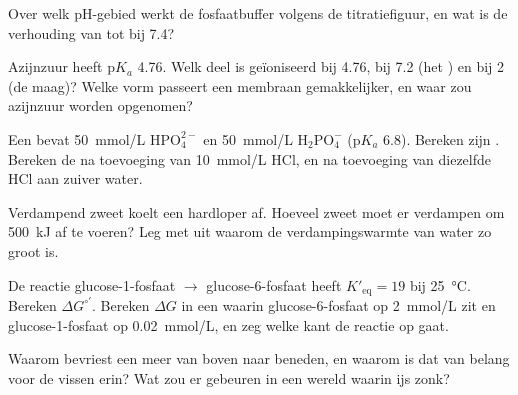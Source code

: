 \begin{exercise}[$\star$]\label{exo:b1:water-small-molecules:4}
Over welk pH-gebied werkt de fosfaatbuffer volgens de titratiefiguur, en wat is
de verhouding van  tot  bij  7.4?
\end{exercise}

\begin{exercise}[$\star\star$]\label{exo:b1:water-small-molecules:5}
Azijnzuur heeft p$K_a$ 4.76. Welk deel is geïoniseerd bij  4.76, bij  7.2
(het ) en bij  2 (de maag)? Welke vorm passeert een membraan
gemakkelijker, en waar zou azijnzuur worden opgenomen?
\end{exercise}

\begin{exercise}[$\star\star$]\label{exo:b1:water-small-molecules:6}
Een  bevat \qty{50}{mmol/L} $\mathrm{HPO_4^{2-}}$ en \qty{50}{mmol/L}
$\mathrm{H_2PO_4^-}$ (p$K_a$ 6.8). Bereken zijn . Bereken de  na toevoeging
van \qty{10}{mmol/L} HCl, en na toevoeging van diezelfde HCl aan zuiver water.
\end{exercise}

\begin{exercise}[$\star\star$]\label{exo:b1:water-small-molecules:7}
Verdampend zweet koelt een hardloper af. Hoeveel zweet moet er verdampen om
\qty{500}{kJ} af te voeren? Leg met  uit waarom de
verdampingswarmte van water zo groot is.
\end{exercise}

\begin{exercise}[$\star\star$]\label{exo:b1:water-small-molecules:8}
De reactie glucose-1-fosfaat $\to$ glucose-6-fosfaat heeft
$K'_{\text{eq}} = 19$ bij \qty{25}{\celsius}. Bereken
$\Delta G^{\circ\prime}$. Bereken $\Delta G$ in een  waarin
glucose-6-fosfaat op \qty{2}{mmol/L} zit en glucose-1-fosfaat op
\qty{0.02}{mmol/L}, en zeg welke kant de reactie op gaat.
\end{exercise}

\begin{exercise}[$\star\star$]\label{exo:b1:water-small-molecules:9}
Waarom bevriest een meer van boven naar beneden, en waarom is dat van belang voor
de vissen erin? Wat zou er gebeuren in een wereld waarin ijs zonk?
\end{exercise}

